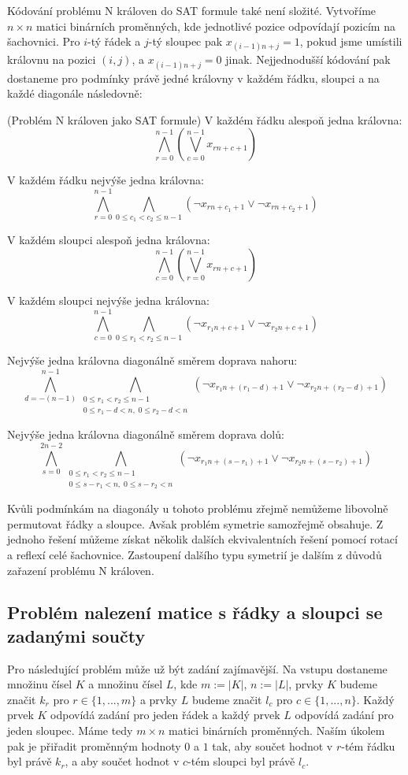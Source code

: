 Kódování problému N královen do SAT formule také není složité. Vytvoříme $n\times n$ matici binárních proměnných, kde jednotlivé pozice odpovídají pozicím na šachovnici. Pro $i$-tý řádek a $j$-tý sloupec pak $x_{(i-1)n+j} = 1$, pokud jsme umístili královnu na pozici $(i, j)$, a $x_{(i-1)n+j}=0$ jinak. Nejjednodušší kódování pak dostaneme pro podmínky právě jedné královny v každém řádku, sloupci a na každé diagonále následovně:

\begin{pozn}{(Problém N královen jako SAT formule)}
V každém řádku alespoň jedna královna: \[
\bigwedge_{r=0}^{n-1}
\left(
\bigvee_{c=0}^{n-1}
x_{rn+c+1}
\right)
\]

V každém řádku nejvýše jedna královna: \[
\bigwedge_{r=0}^{n-1}
\bigwedge_{0 \le c_1 < c_2 \le n-1}
\left(
\neg x_{rn+c_1+1} \vee
\neg x_{rn+c_2+1}
\right)
\]

V každém sloupci alespoň jedna královna: \[
\bigwedge_{c=0}^{n-1}
\left(
\bigvee_{r=0}^{n-1}
x_{rn+c+1}
\right)
\]

V každém sloupci nejvýše jedna královna: \[
\bigwedge_{c=0}^{n-1}
\bigwedge_{0 \le r_1 < r_2 \le n-1}
\left(
\neg x_{r_1 n+c+1} \vee
\neg x_{r_2 n+c+1}
\right)
\]

Nejvýše jedna královna diagonálně směrem doprava nahoru:
\[
\bigwedge_{d=-(n-1)}^{n-1}
\bigwedge_{\substack{
0 \le r_1 < r_2 \le n-1 \\
0 \le r_1-d < n,\; 0 \le r_2-d < n
}}
\left(
\neg x_{r_1 n+(r_1-d)+1} \vee
\neg x_{r_2 n+(r_2-d)+1}
\right)
\]

Nejvýše jedna královna diagonálně směrem doprava dolů:
\[
\bigwedge_{s=0}^{2n-2}
\bigwedge_{\substack{
0 \le r_1 < r_2 \le n-1 \\
0 \le s-r_1 < n,\; 0 \le s-r_2 < n
}}
\left(
\neg x_{r_1 n+(s-r_1)+1} \vee
\neg x_{r_2 n+(s-r_2)+1}
\right)
\]
\end{pozn}

Kvůli podmínkám na diagonály u tohoto problému zřejmě nemůžeme libovolně permutovat řádky a sloupce. Avšak problém symetrie samozřejmě obsahuje. Z jednoho řešení můžeme získat několik dalších ekvivalentních řešení pomocí rotací a reflexí celé šachovnice. Zastoupení dalšího typu symetrií je dalším z důvodů zařazení problému N královen.

\subsection{Problém nalezení matice s řádky a sloupci se zadanými součty}
Pro následující problém může už být zadání zajímavější. Na vstupu dostaneme množinu čísel $K$ a množinu čísel $L$, kde $m:=|K|$, $n:=|L|$, prvky $K$ budeme značit $k_r$ pro $r\in \{1,...,m\}$ a prvky $L$ budeme značit $l_c$ pro $c\in \{1,...,n\}$. Každý prvek $K$ odpovídá zadání pro jeden řádek a každý prvek $L$ odpovídá zadání pro jeden sloupec. Máme tedy $m\times n$ matici binárních proměnných. Naším úkolem pak je přiřadit proměnným hodnoty $0$ a $1$ tak, aby součet hodnot v $r$-tém řádku byl právě $k_r$, a aby součet hodnot v $c$-tém sloupci byl právě $l_c$.

